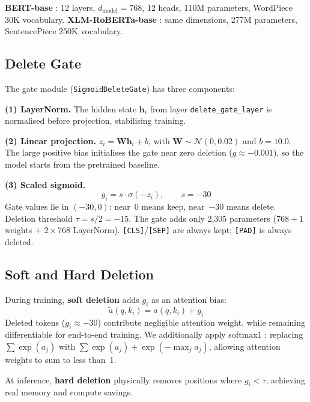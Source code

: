 \documentclass[11pt,a4paper]{article}
\begin{document}
\textbf{BERT-base} \citep{devlin2019bert}: 12 layers, $d_{\text{model}}=768$, 12 heads, 110M parameters, WordPiece 30K vocabulary. \textbf{XLM-RoBERTa-base} \citep{conneau2020xlmr}: same dimensions, 277M parameters, SentencePiece 250K vocabulary.


\subsection{Delete Gate}
\label{sec:delete-gate}

The gate module (\texttt{SigmoidDeleteGate}) has three components:

\textbf{(1) LayerNorm.} The hidden state $\mathbf{h}_i$ from layer \texttt{delete\_gate\_layer} is normalised before projection, stabilising training.

\textbf{(2) Linear projection.} $z_i = \mathbf{W}\mathbf{h}_i + b$, with $\mathbf{W}\sim\mathcal{N}(0,0.02)$ and $b=10.0$. The large positive bias initialises the gate near zero deletion ($g\approx-0.001$), so the model starts from the pretrained baseline.

\textbf{(3) Scaled sigmoid.}
\begin{equation}
    g_i = s \cdot \sigma(-z_i), \qquad s = -30
    \label{eq:scaled-sigmoid}
\end{equation}
Gate values lie in $(-30,0)$: near~$0$ means keep, near~$-30$ means delete. Deletion threshold $\tau = s/2 = -15$. The gate adds only 2,305 parameters ($768+1$ weights $+$ $2{\times}768$ LayerNorm). \texttt{[CLS]}/\texttt{[SEP]} are always kept; \texttt{[PAD]} is always deleted.


\subsection{Soft and Hard Deletion}

During training, \textbf{soft deletion} adds $g_i$ as an attention bias:
\begin{equation}
    \tilde{a}(q, k_i) = a(q, k_i) + g_i
\end{equation}
Deleted tokens ($g_i\approx-30$) contribute negligible attention weight, while remaining differentiable for end-to-end training. We additionally apply softmax1 \citep{kallini2024mrt5}: replacing $\sum\exp(a_j)$ with $\sum\exp(a_j)+\exp(-\max_j a_j)$, allowing attention weights to sum to less than~1.

At inference, \textbf{hard deletion} physically removes positions where $g_i<\tau$, achieving real memory and compute savings.
\end{document}
